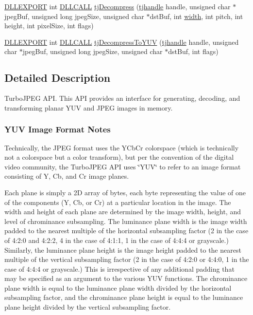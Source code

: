 \begin{DoxyCompactItemize}
\item 
\hyperlink{turbojpeg_8h_a808e08638be3cba36e36759e5b150de0}{D\+L\+L\+E\+X\+P\+O\+RT} int \hyperlink{turbojpeg_8h_a54b25836118bfac94a53a7b790f3ccb2}{D\+L\+L\+C\+A\+LL} \hyperlink{group___turbo_j_p_e_g_ga5809053e92c9655b70c848eb3b91f6cb}{tj\+Decompress} (\hyperlink{group___turbo_j_p_e_g_ga758d2634ecb4949de7815cba621f5763}{tjhandle} handle, unsigned char $\ast$jpeg\+Buf, unsigned long jpeg\+Size, unsigned char $\ast$dst\+Buf, int \hyperlink{png_8h_ad46179dbe9c68fdcea52b34c3480ec0f}{width}, int pitch, int height, int pixel\+Size, int flags)
\item 
\hyperlink{turbojpeg_8h_a808e08638be3cba36e36759e5b150de0}{D\+L\+L\+E\+X\+P\+O\+RT} int \hyperlink{turbojpeg_8h_a54b25836118bfac94a53a7b790f3ccb2}{D\+L\+L\+C\+A\+LL} \hyperlink{group___turbo_j_p_e_g_gad7810af095624a4016e72957a50f77d8}{tj\+Decompress\+To\+Y\+UV} (\hyperlink{group___turbo_j_p_e_g_ga758d2634ecb4949de7815cba621f5763}{tjhandle} handle, unsigned char $\ast$jpeg\+Buf, unsigned long jpeg\+Size, unsigned char $\ast$dst\+Buf, int flags)
\end{DoxyCompactItemize}


\subsection{Detailed Description}
Turbo\+J\+P\+EG A\+PI. This A\+PI provides an interface for generating, decoding, and transforming planar Y\+UV and J\+P\+EG images in memory.

\label{group___turbo_j_p_e_g_YUVnotes}%
%
\subsubsection*{Y\+UV Image Format Notes }

Technically, the J\+P\+EG format uses the Y\+Cb\+Cr colorspace (which is technically not a colorspace but a color transform), but per the convention of the digital video community, the Turbo\+J\+P\+EG A\+PI uses \char`\"{}\+Y\+U\+V\char`\"{} to refer to an image format consisting of Y, Cb, and Cr image planes.

Each plane is simply a 2D array of bytes, each byte representing the value of one of the components (Y, Cb, or Cr) at a particular location in the image. The width and height of each plane are determined by the image width, height, and level of chrominance subsampling. The luminance plane width is the image width padded to the nearest multiple of the horizontal subsampling factor (2 in the case of 4\+:2\+:0 and 4\+:2\+:2, 4 in the case of 4\+:1\+:1, 1 in the case of 4\+:4\+:4 or grayscale.) Similarly, the luminance plane height is the image height padded to the nearest multiple of the vertical subsampling factor (2 in the case of 4\+:2\+:0 or 4\+:4\+:0, 1 in the case of 4\+:4\+:4 or grayscale.) This is irrespective of any additional padding that may be specified as an argument to the various Y\+UV functions. The chrominance plane width is equal to the luminance plane width divided by the horizontal subsampling factor, and the chrominance plane height is equal to the luminance plane height divided by the vertical subsampling factor.

